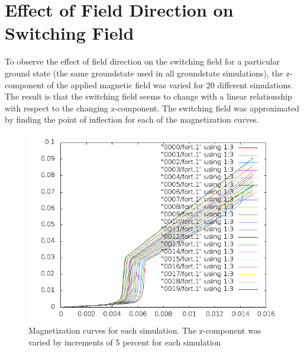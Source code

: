 \documentclass{article}
\begin{document}
\section{Effect of Field Direction on Switching Field}
To observe the effect of field direction on the switching field for a particular ground state (the same groundstate used in
all groundstate simulations), the z-component of the applied magnetic field was varied for 20 different simulations.
The result is that the switching field seems to change with a linear relationship with respect to the changing z-component.
The switching field was approximated by finding the point of inflection for each of the magnetization curves. 
\begin{figure}[ht]
\centering
 \includegraphics[scale=0.6]{VariedZdirection/Magnetizations.png}
 \caption{Magnetization curves for each simulation. The z-component was varied by increments of 5 percent for each simulation}
\end{figure}
\clearpage
\end{document}

